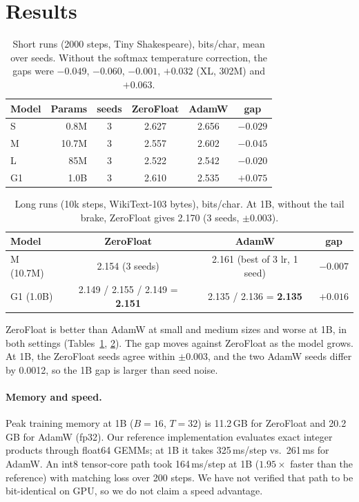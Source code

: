 \documentclass[11pt]{article}
\begin{document}
\section{Results}\label{sec:results}
\begin{table}[h]\centering
\begin{tabular}{lrcccc}\toprule
Model & Params & seeds & ZeroFloat & AdamW & gap \\\midrule
S & 0.8M & 3 & 2.627 & 2.656 & $-0.029$ \\
M & 10.7M & 3 & 2.557 & 2.602 & $-0.045$ \\
L & 85M & 3 & 2.522 & 2.542 & $-0.020$ \\
G1 & 1.0B & 3 & 2.610 & 2.535 & $+0.075$ \\\bottomrule
\end{tabular}
\caption{Short runs (2000 steps, Tiny Shakespeare), bits/char, mean over seeds. Without the softmax temperature correction, the gaps were $-0.049$, $-0.060$, $-0.001$, $+0.032$ (XL, 302M) and $+0.063$.}\label{tab:short}
\end{table}

\begin{table}[h]\centering
\begin{tabular}{lccc}\toprule
Model & ZeroFloat & AdamW & gap \\\midrule
M (10.7M) & 2.154 (3 seeds) & 2.161 (best of 3 lr, 1 seed) & $-0.007$ \\
G1 (1.0B) & 2.149 / 2.155 / 2.149 = \textbf{2.151} & 2.135 / 2.136 = \textbf{2.135} & $+0.016$ \\\bottomrule
\end{tabular}
\caption{Long runs (10k steps, WikiText-103 bytes), bits/char. At 1B, without the tail brake, ZeroFloat gives 2.170 (3 seeds, $\pm$0.003).}\label{tab:long}
\end{table}

ZeroFloat is better than AdamW at small and medium sizes and worse at 1B, in both settings (Tables~\ref{tab:short}, \ref{tab:long}). The gap moves against ZeroFloat as the model grows. At 1B, the ZeroFloat seeds agree within $\pm0.003$, and the two AdamW seeds differ by 0.0012, so the 1B gap is larger than seed noise.

\paragraph{Memory and speed.} Peak training memory at 1B ($B=16$, $T=32$) is 11.2\,GB for ZeroFloat and 20.2\,GB for AdamW (fp32). Our reference implementation evaluates exact integer products through float64 GEMMs; at 1B it takes 325\,ms/step vs.\ 261\,ms for AdamW. An int8 tensor-core path took 164\,ms/step at 1B ($1.95\times$ faster than the reference) with matching loss over 200 steps. We have not verified that path to be bit-identical on GPU, so we do not claim a speed advantage.
\end{document}
